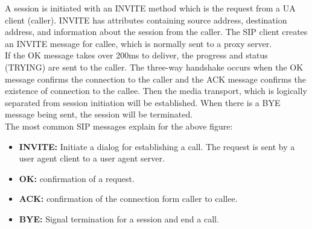     A session is initiated with an INVITE method which is the request from a UA client (caller). 
    INVITE has attributes containing source address, destination address, and information about the session from the caller. 
    The SIP client creates an INVITE message for callee, which is normally sent to a proxy server. \\

    \noindent If the OK message takes over 200ms to deliver, the progress and status (TRYING) are sent to the caller. 
    The three-way handshake occurs when the OK message confirms the connection to the caller and the ACK message confirms the existence of connection to the callee. 
    Then the media transport, which is logically separated from session initiation will be established. When there is a BYE message being sent, the session will be terminated. \\

    \noindent The most common SIP messages explain for the above figure:
    \begin{itemize}
        \item \textbf {INVITE:} Initiate a dialog for establishing a call. The request is sent by a user agent client to a user agent server.
        \item \textbf {OK:} confirmation of a request.
        \item \textbf {ACK:} confirmation of the connection form caller to callee.
        \item \textbf{BYE:} Signal termination for a session and end a call.
    \end{itemize}

